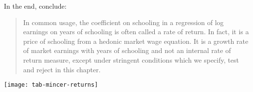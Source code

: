 \begin{frame}
In the end,  conclude:\vspace{0.5cm}

\begin{quote}
In common usage, the coefficient on schooling in a regression of log earnings on years of schooling is often called a rate of return. In fact, it is a price of schooling from a hedonic market wage equation. It is a growth rate of market earnings with years of schooling and not an internal rate of return measure, except under stringent conditions which we specify, test and reject in this chapter.
\end{quote}
\end{frame}
\begin{frame}[plain]
\begin{center}
\texttt{[image: tab-mincer-returns]}
\end{center}
\end{frame}
